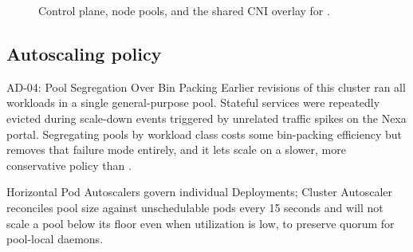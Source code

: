 \begin{figure}[htbp]
\caption{Control plane, node pools, and the shared CNI overlay for .}
\label{fig:topology}
\end{figure}

\subsection{Autoscaling policy}
\begin{specbox}{AD-04: Pool Segregation Over Bin Packing}
Earlier revisions of this cluster ran all workloads in a single general-purpose pool. Stateful services were repeatedly evicted during scale-down events triggered by unrelated traffic spikes on the Nexa portal. Segregating pools by workload class costs some bin-packing efficiency but removes that failure mode entirely, and it lets  scale on a slower, more conservative policy than .
\end{specbox}
Horizontal Pod Autoscalers govern individual Deployments; Cluster Autoscaler reconciles pool size against unschedulable pods every 15 seconds and will not scale a pool below its floor even when utilization is low, to preserve quorum for pool-local daemons.
